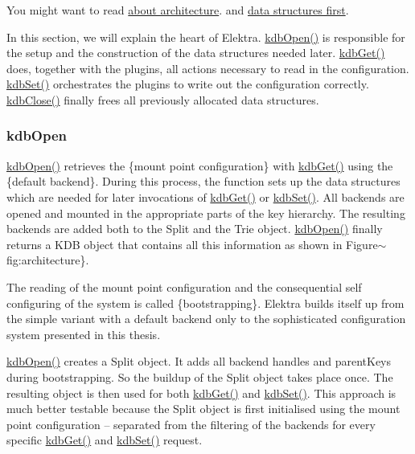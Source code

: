 You might want to read \hyperlink{md_doc_help_elektra-architecture_doc_help_elektra-architecture_md}{about architecture}. and \hyperlink{md_doc_help_elektra-data-structures_doc_help_elektra-data-structures_md}{data structures first}.

In this section, we will explain the heart of Elektra. {\ttfamily \hyperlink{group__kdb_ga6808defe5870f328dd17910aacbdc6ca}{kdb\+Open()}} is responsible for the setup and the construction of the data structures needed later. {\ttfamily \hyperlink{group__kdb_ga28e385fd9cb7ccfe0b2f1ed2f62453a1}{kdb\+Get()}} does, together with the plugins, all actions necessary to read in the configuration. {\ttfamily \hyperlink{group__kdb_ga11436b058408f83d303ca5e996832bcf}{kdb\+Set()}} orchestrates the plugins to write out the configuration correctly. {\ttfamily \hyperlink{group__kdb_gadb54dc9fda17ee07deb9444df745c96f}{kdb\+Close()}} finally frees all previously allocated data structures.

\subsubsection*{kdb\+Open}

{\ttfamily \hyperlink{group__kdb_ga6808defe5870f328dd17910aacbdc6ca}{kdb\+Open()}} retrieves the \{mount point configuration\} with {\ttfamily \hyperlink{group__kdb_ga28e385fd9cb7ccfe0b2f1ed2f62453a1}{kdb\+Get()}} using the \{default backend\}. During this process, the function sets up the data structures which are needed for later invocations of {\ttfamily \hyperlink{group__kdb_ga28e385fd9cb7ccfe0b2f1ed2f62453a1}{kdb\+Get()}} or {\ttfamily \hyperlink{group__kdb_ga11436b058408f83d303ca5e996832bcf}{kdb\+Set()}}. All backends are opened and mounted in the appropriate parts of the key hierarchy. The resulting backends are added both to the {\ttfamily Split} and the {\ttfamily Trie} object. {\ttfamily \hyperlink{group__kdb_ga6808defe5870f328dd17910aacbdc6ca}{kdb\+Open()}} finally returns a {\ttfamily K\+D\+B} object that contains all this information as shown in Figure$\sim$fig\+:architecture\}.

The reading of the mount point configuration and the consequential self configuring of the system is called \{bootstrapping\}. Elektra builds itself up from the simple variant with a default backend only to the sophisticated configuration system presented in this thesis.

{\ttfamily \hyperlink{group__kdb_ga6808defe5870f328dd17910aacbdc6ca}{kdb\+Open()}} creates a {\ttfamily Split} object. It adds all backend handles and {\ttfamily parent\+Keys} during bootstrapping. So the buildup of the {\ttfamily Split} object takes place once. The resulting object is then used for both {\ttfamily \hyperlink{group__kdb_ga28e385fd9cb7ccfe0b2f1ed2f62453a1}{kdb\+Get()}} and {\ttfamily \hyperlink{group__kdb_ga11436b058408f83d303ca5e996832bcf}{kdb\+Set()}}. This approach is much better testable because the {\ttfamily Split} object is first initialised using the mount point configuration -- separated from the filtering of the backends for every specific {\ttfamily \hyperlink{group__kdb_ga28e385fd9cb7ccfe0b2f1ed2f62453a1}{kdb\+Get()}} and {\ttfamily \hyperlink{group__kdb_ga11436b058408f83d303ca5e996832bcf}{kdb\+Set()}} request.

